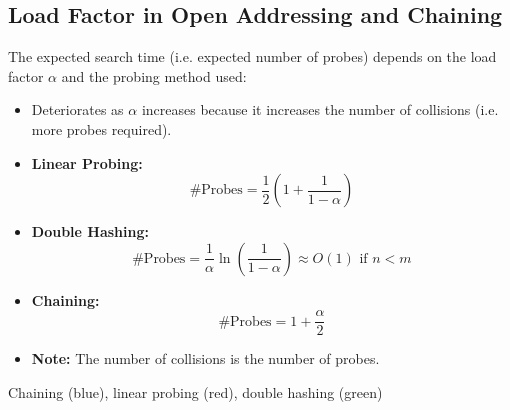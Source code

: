 \subsection{Load Factor in Open Addressing and Chaining}
\begin{definition}
    The expected search time (i.e. expected number of probes) depends on the load factor \( \alpha \) and the probing method used:
    \begin{itemize}
        \item Deteriorates as $\alpha$ increases because it increases the number of collisions (i.e. more probes required).
    \end{itemize}

    \begin{itemize}
        \item \textbf{Linear Probing:} 
        \[
        \text{\# Probes} = \frac{1}{2} \left( 1 + \frac{1}{1 - \alpha} \right)
        \]
        \item \textbf{Double Hashing:} 
        \[
        \text{\# Probes} = \frac{1}{\alpha} \ln \left( \frac{1}{1 - \alpha} \right) \approx O(1) \text{ if } n<m
        \]
        \item \textbf{Chaining:}
        \[
            \text{\# Probes} = 1 + \frac{\alpha}{2}
            \]
    \end{itemize}
    \begin{itemize}
        \item \textbf{Note:} The number of collisions is the number of probes.
    \end{itemize}
\end{definition}

\begin{intuition}
    Chaining (blue), linear probing (red), double hashing (green)

\end{intuition}
